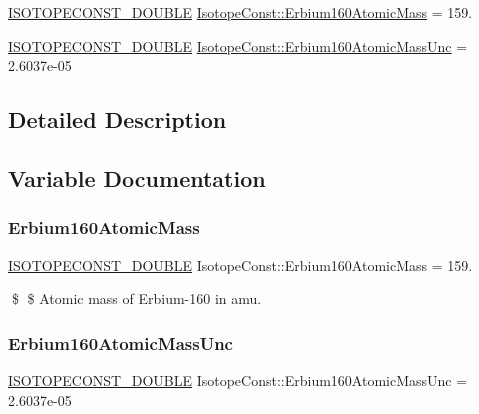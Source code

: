 \begin{DoxyCompactItemize}
\item 
\mbox{\hyperlink{group___isotope_const-_macros_ga8f45a7272ce02c0b4c65c44636ed719a}{I\+S\+O\+T\+O\+P\+E\+C\+O\+N\+S\+T\+\_\+\+D\+O\+U\+B\+LE}} \mbox{\hyperlink{group___isotope_const-_erbium-_er160_ga9677c09b75c105a08f147231b63ad795}{Isotope\+Const\+::\+Erbium160\+Atomic\+Mass}} = 159.
\item 
\mbox{\hyperlink{group___isotope_const-_macros_ga8f45a7272ce02c0b4c65c44636ed719a}{I\+S\+O\+T\+O\+P\+E\+C\+O\+N\+S\+T\+\_\+\+D\+O\+U\+B\+LE}} \mbox{\hyperlink{group___isotope_const-_erbium-_er160_ga77c21f2d61d5ff33b31156a144d4d07c}{Isotope\+Const\+::\+Erbium160\+Atomic\+Mass\+Unc}} = 2.\+6037e-\/05
\end{DoxyCompactItemize}


\subsection{Detailed Description}


\subsection{Variable Documentation}
\mbox{\label{group___isotope_const-_erbium-_er160_ga9677c09b75c105a08f147231b63ad795}} 
\subsubsection{\texorpdfstring{Erbium160\+Atomic\+Mass}{Erbium160AtomicMass}}
{\footnotesize\ttfamily \mbox{\hyperlink{group___isotope_const-_macros_ga8f45a7272ce02c0b4c65c44636ed719a}{I\+S\+O\+T\+O\+P\+E\+C\+O\+N\+S\+T\+\_\+\+D\+O\+U\+B\+LE}} Isotope\+Const\+::\+Erbium160\+Atomic\+Mass = 159.}

\$ \$ Atomic mass of Erbium-\/160 in amu. \mbox{\label{group___isotope_const-_erbium-_er160_ga77c21f2d61d5ff33b31156a144d4d07c}} 
\subsubsection{\texorpdfstring{Erbium160\+Atomic\+Mass\+Unc}{Erbium160AtomicMassUnc}}
{\footnotesize\ttfamily \mbox{\hyperlink{group___isotope_const-_macros_ga8f45a7272ce02c0b4c65c44636ed719a}{I\+S\+O\+T\+O\+P\+E\+C\+O\+N\+S\+T\+\_\+\+D\+O\+U\+B\+LE}} Isotope\+Const\+::\+Erbium160\+Atomic\+Mass\+Unc = 2.\+6037e-\/05}

